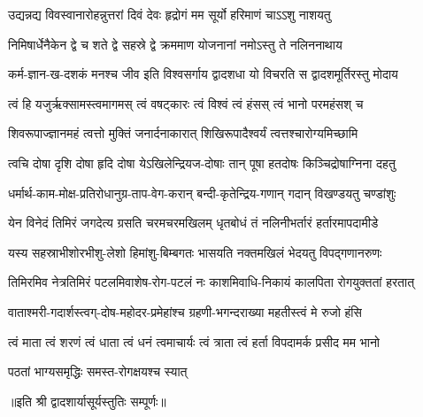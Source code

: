 

\twolineshloka
{उद्यन्नद्य विवस्वानारोहन्नुत्तरां दिवं देवः}
{हृद्रोगं मम सूर्यो हरिमाणं चाऽऽशु नाशयतु}%

\twolineshloka
{निमिषार्धेनैकेन द्वे च शते द्वे सहस्रे द्वे}
{क्रममाण योजनानां नमोऽस्तु ते नलिननाथाय}%

\twolineshloka
{कर्म-ज्ञान-ख-दशकं मनश्च जीव इति विश्वसर्गाय}
{द्वादशधा यो विचरति स द्वादशमूर्तिरस्तु मोदाय}%

\twolineshloka
{त्वं हि यजुर्ऋक्सामस्त्वमागमस् त्वं वषट्कारः}
{त्वं विश्वं त्वं हंसस् त्वं भानो परमहंसश् च}%

\twolineshloka
{शिवरूपाज्ज्ञानमहं त्वत्तो मुक्तिं जनार्दनाकारात्}
{शिखिरूपादैश्वर्यं त्वत्तश्चारोग्यमिच्छामि}%

\twolineshloka
{त्वचि दोषा दृशि दोषा हृदि दोषा येऽखिलेन्द्रियज-दोषाः}
{तान् पूषा हतदोषः किञ्चिद्रोषाग्निना दहतु}%

\twolineshloka
{धर्मार्थ-काम-मोक्ष-प्रतिरोधानुग्र-ताप-वेग-करान्}
{बन्दी-कृतेन्द्रिय-गणान् गदान् विखण्डयतु चण्डांशुः}%

\twolineshloka
{येन विनेदं तिमिरं जगदेत्य ग्रसति चरमचरमखिलम्}
{धृतबोधं तं नलिनीभर्तारं हर्तारमापदामीडे}%

\twolineshloka
{यस्य सहस्राभीशोरभीशु-लेशो हिमांशु-बिम्बगतः}
{भासयति नक्तमखिलं भेदयतु विपद्गणानरुणः}%

\twolineshloka
{तिमिरमिव नेत्रतिमिरं पटलमिवाशेष-रोग-पटलं नः}
{काशमिवाधि-निकायं कालपिता रोगयुक्ततां हरतात्}%

\twolineshloka
{वाताश्मरी-गदार्शस्त्वग्-दोष-महोदर-प्रमेहांश्च}
{ग्रहणी-भगन्दराख्या महतीस्त्वं मे रुजो हंसि}%

\twolineshloka
{त्वं माता त्वं शरणं त्वं धाता त्वं धनं त्वमाचार्यः}
{त्वं त्राता त्वं हर्ता विपदामर्क प्रसीद मम भानो}%

{पठतां भाग्यसमृद्धिः समस्त-रोगक्षयश्च स्यात्}

॥इति श्री द्वादशार्यासूर्यस्तुतिः सम्पूर्णः॥
